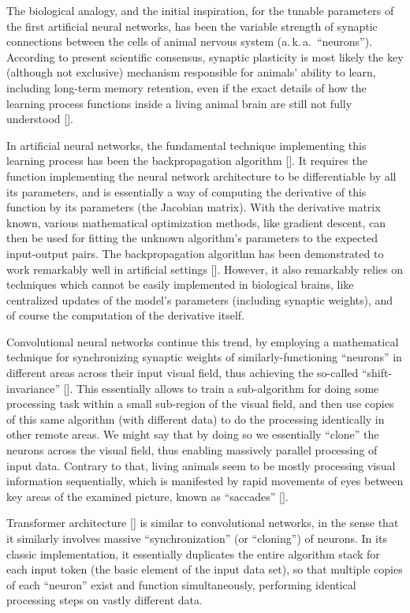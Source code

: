 \documentclass[12pt]{article}
\newcommand{\citestrut}[1]{\vphantom{[}{#1}\vphantom{]}}
\renewcommand{\cite}[1]{[\hyperlink{#1}{\citestrut{#1}}]}
\begin{document}
The biological analogy, and the initial inspiration, for the tunable parameters of the
first artificial neural networks, has been the variable strength of synaptic connections
between the cells of animal nervous system (a.\,k.\,a.\ ``neurons''). According to
present scientific consensus, synaptic plasticity is most likely the key (although not
exclusive) mechanism responsible for animals' ability to learn, including long-term
memory retention, even if the exact details of how the learning process functions inside
a living animal brain are still not fully understood \cite{SynapticPlasticity}.

In artificial neural networks, the fundamental technique implementing this learning
process has been the backpropagation algorithm \cite{Backpropagation}. It requires the
function implementing the neural network architecture to be differentiable by all its
parameters, and is essentially a way of computing the derivative of this function by its
parameters (the Jacobian matrix). With the derivative matrix known, various mathematical
optimization methods, like gradient descent, can then be used for fitting the unknown
algorithm's parameters to the expected input-output pairs. The backpropagation algorithm
has been demonstrated to work remarkably well in artificial settings
\cite{GeoffreyHinton}. However, it also remarkably relies on techniques which cannot be
easily implemented in biological brains, like centralized updates of the model's
parameters (including synaptic weights), and of course the computation of the derivative
itself.

Convolutional neural networks continue this trend, by employing a mathematical technique
for synchronizing synaptic weights of similarly-functioning ``neurons'' in different
areas across their input visual field, thus achieving the so-called ``shift-invariance''
\cite{Convolution}. This essentially allows to train a sub-algorithm for doing some
processing task within a small sub-region of the visual field, and then use copies of
this same algorithm (with different data) to do the processing identically in other
remote areas. We might say that by doing so we essentially ``clone'' the neurons across
the visual field, thus enabling massively parallel processing of input data. Contrary to
that, living animals seem to be mostly processing visual information sequentially, which
is manifested by rapid movements of eyes between key areas of the examined picture, known
as ``saccades'' \cite{Saccades}.

Transformer architecture \cite{Transformers} is similar to convolutional networks, in the
sense that it similarly involves massive ``synchronization'' (or ``cloning'') of neurons.
In its classic implementation, it essentially duplicates the entire algorithm stack for
each input token (the basic element of the input data set), so that multiple copies of
each ``neuron'' exist and function simultaneously, performing identical processing steps
on vastly different data.
\end{document}
